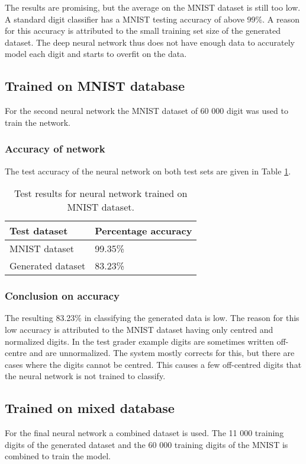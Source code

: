 The results are promising, but the average on the MNIST dataset is still too low. A standard digit classifier has a MNIST testing accuracy of above 99\%. A reason for this accuracy is attributed to the small training set size of the generated dataset. The deep neural network thus does not have enough data to accurately model each digit and starts to overfit on the data.

\subsection{Trained on MNIST database}
For the second neural network the MNIST dataset of 60 000 digit was used to train the network.

\subsubsection{Accuracy of network}
The test accuracy of the neural network on both test sets are given in Table \ref{tbl:nnResult2}.

\begin{table}[h]
\caption{Test results for neural network trained on MNIST dataset.} \label{tbl:nnResult2}
  \centering
\begin{tabular}{|p{4cm}|p{5cm}|}
\hline
\textbf{Test dataset}&\textbf{Percentage accuracy}\\
\hline
MNIST dataset&99.35\%\\
\hline
Generated dataset&83.23\%\\
\hline
\end{tabular}
\end{table}

\subsubsection{Conclusion on accuracy}

The resulting 83.23\% in classifying the generated data is low. The reason for this low accuracy is attributed to the MNIST dataset having only centred and normalized digits. In the test grader example digits are sometimes written off-centre and are unnormalized. The system mostly corrects for this, but there are cases where the digits cannot be centred. This causes a few off-centred digits that the neural network is not trained to classify.

\subsection{Trained on mixed database}
For the final neural network a combined dataset is used. The 11 000 training digits of the generated dataset and the 60 000 training digits of the MNIST is combined to train the model.

